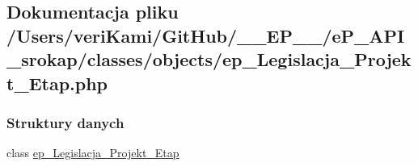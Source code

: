 \hypertarget{ep___legislacja___projekt___etap_8php}{\subsection{Dokumentacja pliku /\-Users/veri\-Kami/\-Git\-Hub/\-\_\-\-\_\-\-E\-P\-\_\-\-\_\-/e\-P\-\_\-\-A\-P\-I\-\_\-srokap/classes/objects/ep\-\_\-\-Legislacja\-\_\-\-Projekt\-\_\-\-Etap.php}
\label{ep___legislacja___projekt___etap_8php}
}
\subsubsection*{Struktury danych}
\begin{DoxyCompactItemize}
\item 
class \hyperlink{classep___legislacja___projekt___etap}{ep\-\_\-\-Legislacja\-\_\-\-Projekt\-\_\-\-Etap}
\end{DoxyCompactItemize}

